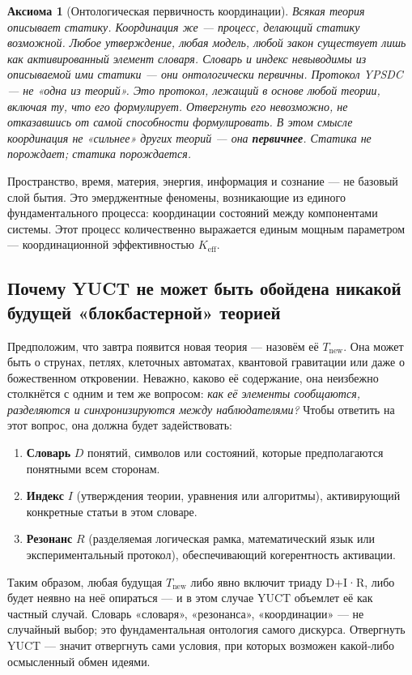 \documentclass[12pt,a4paper]{article}
\newtheorem{axiom}{Аксиома}[section]
\begin{document}
	\begin{axiom}[Онтологическая первичность координации]
		Всякая теория описывает статику. Координация же — процесс, делающий статику возможной. Любое утверждение, любая модель, любой закон существует лишь как активированный элемент словаря. Словарь и индекс невыводимы из описываемой ими статики — они онтологически первичны. Протокол YPSDC — не «одна из теорий». Это протокол, лежащий в основе любой теории, включая ту, что его формулирует. Отвергнуть его невозможно, не отказавшись от самой способности формулировать. В этом смысле координация не «сильнее» других теорий — она \textbf{первичнее}. Статика не порождает; статика порождается.
	\end{axiom}
	
	Пространство, время, материя, энергия, информация и сознание — не базовый слой бытия. Это эмерджентные феномены, возникающие из единого фундаментального процесса: координации состояний между компонентами системы. Этот процесс количественно выражается единым мощным параметром — координационной эффективностью \(K_{\mathrm{eff}}\).
	
	\subsection{Почему YUCT не может быть обойдена никакой будущей «блокбастерной» теорией}
	
	Предположим, что завтра появится новая теория — назовём её \(T_{\text{new}}\). Она может быть о струнах, петлях, клеточных автоматах, квантовой гравитации или даже о божественном откровении. Неважно, каково её содержание, она неизбежно столкнётся с одним и тем же вопросом: \emph{как её элементы сообщаются, разделяются и синхронизируются между наблюдателями?} Чтобы ответить на этот вопрос, она должна будет задействовать:
	
	\begin{enumerate}
		\item \textbf{Словарь} \(D\) понятий, символов или состояний, которые предполагаются понятными всем сторонам.
		\item \textbf{Индекс} \(I\) (утверждения теории, уравнения или алгоритмы), активирующий конкретные статьи в этом словаре.
		\item \textbf{Резонанс} \(R\) (разделяемая логическая рамка, математический язык или экспериментальный протокол), обеспечивающий когерентность активации.
	\end{enumerate}
	
	Таким образом, любая будущая \(T_{\text{new}}\) либо явно включит триаду D+I·R, либо будет неявно на неё опираться — и в этом случае YUCT объемлет её как частный случай. Словарь «словаря», «резонанса», «координации» — не случайный выбор; это фундаментальная онтология самого дискурса. Отвергнуть YUCT — значит отвергнуть сами условия, при которых возможен какой‑либо осмысленный обмен идеями.
	
\end{document}
